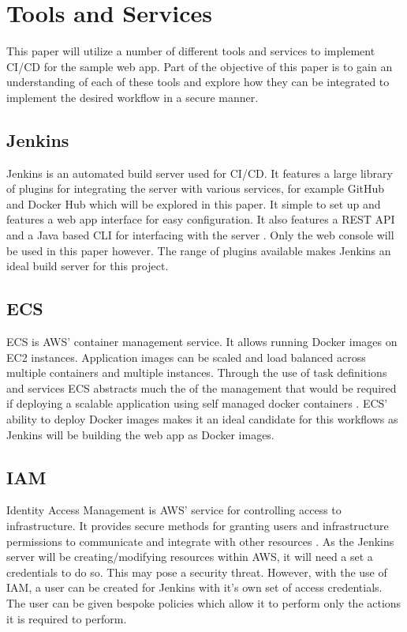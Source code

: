 \section{Tools and Services}
	This paper will utilize a number of different tools and services to implement CI/CD for the sample web app. Part of the objective of this paper is to gain an understanding of each of these tools and explore how they can be integrated to implement the desired workflow in a secure manner.

	\subsection{Jenkins} Jenkins is an automated build server used for CI/CD. It features a large library of plugins for integrating the server with various services, for example GitHub and Docker Hub which will be explored in this paper. It simple to set up and features a web app interface for easy configuration. It also features a REST API and a Java based CLI for interfacing with the server \citep{jenkins}. Only the web console will be used in this paper however. The range of plugins available makes Jenkins an ideal build server for this project.
	
	\subsection{ECS} ECS is AWS' container management service. It allows running Docker images on EC2 instances.  Application images can be scaled and load balanced across multiple containers and multiple instances. Through the use of task definitions and services ECS abstracts much the of the management that would be required if deploying a scalable application using self managed docker containers \citep{ecs}.  ECS' ability to deploy Docker images makes it an ideal candidate for this workflows as Jenkins will be building the web app as Docker images.
	
	\subsection{IAM} Identity Access Management is AWS' service for controlling access to infrastructure. It provides secure methods for granting users and infrastructure permissions to communicate and integrate with other resources \citep{iam}. As the Jenkins server will be creating/modifying resources within AWS, it will need a set a credentials to do so. This may pose a security threat. However, with the use of IAM, a user can be created for Jenkins with it's own set of access credentials. The user can be given bespoke policies which allow it to perform only the actions it is required to perform. 